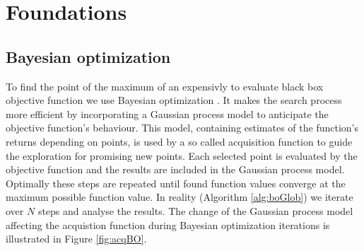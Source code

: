 \chapter{Foundations}
\label{chap:2}

\section{Bayesian optimization}


To find the point of the maximum of an expensivly to evaluate black box objective function we use Bayesian optimization \cite{brochu2010tutorial,shahriari2016taking,lizotte2008practical}. It makes the search process more efficient by incorporating a Gaussian process model to anticipate the objective function's behaviour. This model, containing estimates of the function's returns depending on points, is used by a so called acquisition function to guide the exploration for promising new points. Each selected point is evaluated by the objective function and the results are included in the Gaussian process model. Optimally these steps are repeated until found function values converge at the maximum possible function value. In reality (Algorithm \ref{alg:boGlob}) we iterate over $N$ steps and analyse the results. The change of the Gaussian process model affecting the acquistion function during Bayesian optimization iterations is illustrated in Figure \ref{fig:acqBO}.\\

